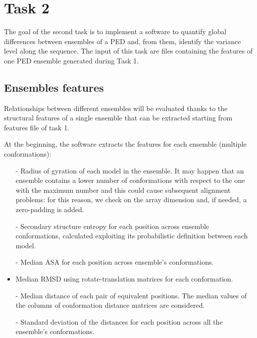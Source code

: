 \section{Task 2}\label{sec:task2}

The goal of the second task is to implement a software to quantify global differences between ensembles of a PED and, from them, identify the variance level along the sequence. The input of this task are files containing the features of one PED ensemble generated during Task 1.

\subsection{Ensembles features}
Relationships between different ensembles will be evaluated thanks to the structural features of a single ensemble that can be extracted starting from features file of task 1.

At the beginning, the software extracts the features for each ensemble (multiple conformations):
\begin{itemize}
\item[-] Radius of gyration of each model in the ensemble. It may happen that an ensemble contains a lower number of conformations with respect to the one with the maximum number and this could cause subsequent alignment problems: for this reason, we check on the array dimension and, if needed, a zero-padding is added.
\item[-] Secondary structure entropy for each position across ensemble conformations, calculated exploiting its probabilistic definition between each model. 
\item[-] Median ASA for each position across ensemble's conformations. 
\item Median RMSD using rotate-translation matrices for each conformation.
\item[-] Median distance of each pair of equivalent positions. The median values of the columns of conformation distance matrices are considered.
\item[-] Standard deviation of the distances for each position across all the ensemble's conformations.
\end{itemize}


